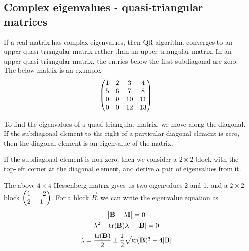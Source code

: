 \documentclass{article}
\begin{document}
\subsection{Complex eigenvalues - quasi-triangular matrices}

If a real matrix has complex eigenvalues, then QR algorithm converges to an 
upper quasi-triangular matrix rather than an upper-triangular matrix. In an upper
quasi-triangular matrix, the entries below the first subdiagonal are zero. The below
matrix is an example.
\begin{align}
    \begin{pmatrix}
        1 & 2 & 3 & 4 \\
        5 & 6 & 7 & 8 \\
        0 & 9 & 10 & 11 \\
        0 & 0 & 12 & 13
    \end{pmatrix}
\end{align}

To find the eigenvalues of a quasi-triangular matrix, we move along the diagonal.
If the subdiagonal element to the right of a particular diagonal element is
zero, then the diagonal element is an eigenvalue of the matrix.

If the subdiagonal element is non-zero, then we consider a $2 \times 2$ block
with the top-left corner at the diagonal element, and derive a pair of
eigenvalues from it.

\begin{figure}[h!]
\centering
{}
\end{figure}

The above $4 \times 4$ Hessenberg matrix gives us two eigenvalues 2 and 1,
and a $2 \times 2$ block $\begin{pmatrix}1 & -2 \\ 2 & 1\end{pmatrix}$. For a block $\vec{B}$,
we can write the eigenvalue equation as
\begin{gather}
    \begin{vmatrix}\mathbf{B} - \lambda\mathbf{I}\end{vmatrix} = 0 \\ 
    \lambda^2 - \operatorname{tr}(\mathbf{B})\lambda + |\mathbf{B}| = 0 \\
    \lambda = \frac{\operatorname{tr}(\mathbf{B})}{2} \pm \frac{1}{2}\sqrt{\operatorname{tr}(\mathbf{B})^2 - 4|\mathbf{B}|}
\end{gather}
\end{document}
